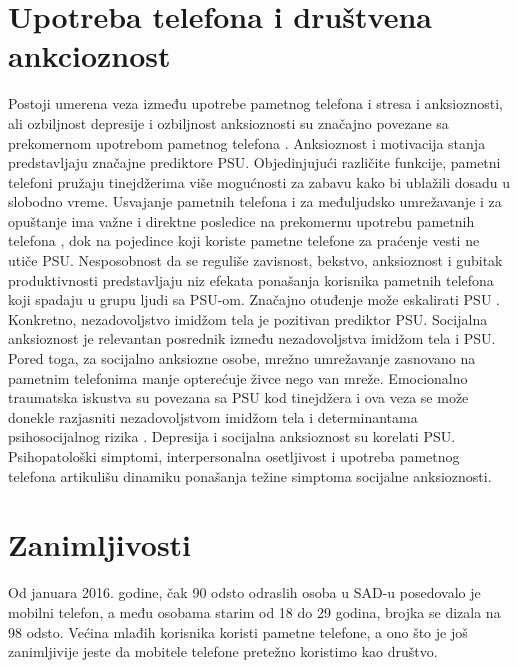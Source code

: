 \documentclass[a4paper]{article}
\begin{document}
\newpage
\section{Upotreba telefona i društvena ankcioznost}
Postoji umerena veza između upotrebe pametnog telefona i stresa i anksioznosti,
ali ozbiljnost depresije i ozbiljnost anksioznosti su značajno povezane
sa prekomernom upotrebom pametnog telefona \cite{anxiety}.
\newline
Anksioznost i motivacija stanja predstavljaju značajne prediktore PSU.
Objedinjujući različite funkcije, pametni telefoni pružaju tinejdžerima više
mogućnosti za zabavu kako bi ublažili dosadu u slobodno vreme.
Usvajanje pametnih telefona i za međuljudsko umrežavanje i za opuštanje
ima važne i direktne posledice na prekomernu upotrebu pametnih telefona \cite{face},
dok na pojedince koji koriste pametne telefone za praćenje vesti ne utiče PSU.
Nesposobnost da se reguliše zavisnost, bekstvo, anksioznost i
gubitak produktivnosti predstavljaju niz efekata
ponašanja korisnika pametnih telefona koji spadaju u grupu ljudi sa PSU-om.
Značajno otuđenje može eskalirati PSU \cite{addict}.
\newline
Konkretno, nezadovoljstvo imidžom tela je pozitivan prediktor PSU.
Socijalna anksioznost je relevantan posrednik između nezadovoljstva
imidžom tela i PSU. Pored toga, za socijalno anksiozne osobe,
mrežno umrežavanje zasnovano na pametnim telefonima manje opterećuje
živce nego van mreže.
Emocionalno traumatska iskustva su povezana sa PSU
kod tinejdžera i ova veza se može donekle razjasniti nezadovoljstvom
imidžom tela i determinantama psihosocijalnog rizika \cite{child}.
\newline
\newline
Depresija i socijalna anksioznost su korelati PSU.
Psihopatološki simptomi, interpersonalna osetljivost i upotreba
pametnog telefona artikulišu dinamiku ponašanja težine simptoma
socijalne anksioznosti.

\newpage

\section{Zanimljivosti}

Od januara 2016. godine, čak 90 odsto odraslih osoba
u SAD-u posedovalo je mobilni telefon,
a među osobama starim od 18 do 29 godina, 
brojka se dizala na 98 odsto. 
Većina mlađih korisnika koristi pametne telefone,
a ono što je još zanimljivije jeste da mobitele telefone pretežno koristimo
kao društvo.
\end{document}
